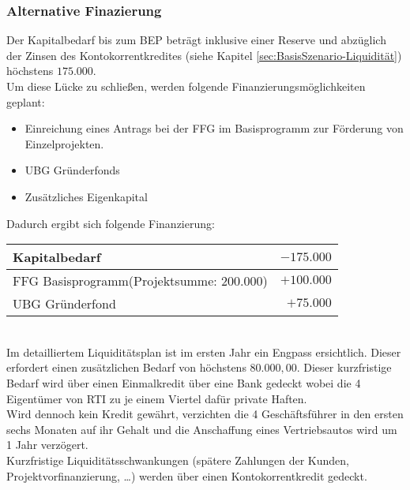 \subsubsection{Alternative Finazierung}
Der Kapitalbedarf bis zum BEP beträgt inklusive einer Reserve und abzüglich der Zinsen des Kontokorrentkredites (siehe Kapitel \ref{sec:BasisSzenario-Liquidität}) höchstens $175.000$\officialeuro.\\
Um diese Lücke zu schließen, werden folgende Finanzierungsmöglichkeiten geplant:
\begin{itemize}
	\item Einreichung eines Antrags bei der FFG im Basisprogramm zur Förderung von Einzelprojekten.
	\item UBG Gründerfonds
	\item Zusätzliches Eigenkapital
\end{itemize}
Dadurch ergibt sich folgende Finanzierung:\\
\begin{tabular}{l r}
	Kapitalbedarf & $-175.000$\officialeuro \\
	\hline
	FFG Basisprogramm(Projektsumme: $200.000$\officialeuro) & $+100.000$\officialeuro \\
	UBG Gründerfond & $+75.000$\officialeuro \\
	\bottomrule
\end{tabular}\\

\noindent Im detailliertem Liquiditätsplan ist im ersten Jahr ein Engpass ersichtlich. Dieser erfordert einen zusätzlichen Bedarf von höchstens $80.000,00$\officialeuro. Dieser kurzfristige Bedarf wird über einen Einmalkredit über eine Bank gedeckt wobei die 4 Eigentümer von \textsf{RTI} zu je einem Viertel dafür private Haften.\\
Wird dennoch kein Kredit gewährt, verzichten die 4 Geschäftsführer in den ersten sechs Monaten auf ihr Gehalt und die Anschaffung eines Vertriebsautos wird um 1 Jahr verzögert.\\

\noindent Kurzfristige Liquiditätsschwankungen (spätere Zahlungen der Kunden, Projektvorfinanzierung, …) werden über einen Kontokorrentkredit gedeckt.

\newpage
